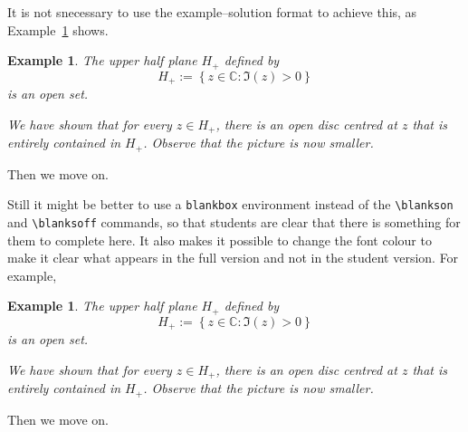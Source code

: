 \documentclass{article}
\theoremstyle{break}
\newcounter{theorem}
\newtheorem{example}[theorem]{Example}
\begin{document}
It is not snecessary to use the example--solution format to achieve this, as Example~\ref{e:upperhalfplane3} shows.
\begin{example}
\label{e:upperhalfplane3}
The upper half plane $H_+$ defined by
\[
H_+:= \left\{z \in \mathbb{C}: \Im (z) > 0 \right\}
\]
is an open set.
\blankson
\begin{center}
\end{center}
We have shown that for every $z \in H_+$, there is an open disc centred at $z$ that is entirely contained in $H_+$.  Observe that the picture is now smaller.
\blanksoff
\end{example}

Then we move on. 

Still it might be better to use a {\tt blankbox} environment instead of the \verb+\blankson+ and \verb+\blanksoff+ commands, so that students are clear that there is something for them to complete here. It also makes it possible to change the font colour to make it clear what appears in the full version and not in the student version. For example,

\begin{example}
The upper half plane $H_+$ defined by
\[
H_+:= \left\{z \in \mathbb{C}: \Im (z) > 0 \right\}
\]
is an open set.
\begin{blankbox}
\begin{center}
\end{center}
We have shown that for every $z \in H_+$, there is an open disc centred at $z$ that is entirely contained in $H_+$.  Observe that the picture is now smaller.
\end{blankbox}
\end{example}
Then we move on.
%

\end{document}
